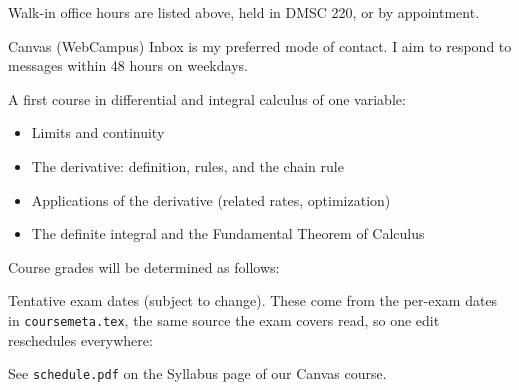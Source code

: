 \documentclass{syllabus}
\begin{document}
\maketitle

\officehours
Walk-in office hours are listed above, held in DMSC 220, or by appointment.

\communication
Canvas (WebCampus) Inbox is my preferred mode of contact. I aim to respond to
messages within 48 hours on weekdays.

\coursedescription
A first course in differential and integral calculus of one variable:
\begin{itemize}
	\item Limits and continuity
	\item The derivative: definition, rules, and the chain rule
	\item Applications of the derivative (related rates, optimization)
	\item The definite integral and the Fundamental Theorem of Calculus
\end{itemize}

Course grades will be determined as follows:


\examschedule
Tentative exam dates (subject to change). These come from the per-exam dates in
\texttt{coursemeta.tex}, the same source the exam covers read, so one edit
reschedules everywhere:

\begin{center}
\examdatetable
\end{center}

\courseschedule
See \texttt{schedule.pdf} on the Syllabus page of our Canvas course.
\end{document}
